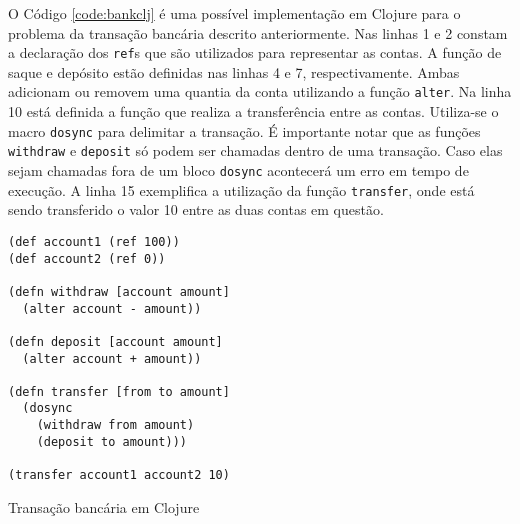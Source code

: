 O Código \ref{code:bankclj} é uma possível implementação em Clojure para o problema da transação bancária descrito anteriormente. Nas linhas 1 e 2 constam a declaração dos \verb|ref|s que são utilizados para representar as contas. A função de saque e depósito estão definidas nas linhas 4 e 7, respectivamente. Ambas adicionam ou removem uma quantia da conta utilizando a função \verb|alter|. Na linha 10 está definida a função que realiza a transferência entre as contas. Utiliza-se o macro \verb|dosync| para delimitar a transação. É importante notar que as funções \verb|withdraw| e \verb|deposit| só podem ser chamadas dentro de uma transação. Caso elas sejam chamadas fora de um bloco \verb|dosync| acontecerá um erro em tempo de execução. A linha 15 exemplifica a utilização da função \verb|transfer|, onde está sendo transferido o valor 10 entre as duas contas em questão.

\begin{listing}
  \begin{verbatim}
(def account1 (ref 100))
(def account2 (ref 0))

(defn withdraw [account amount]
  (alter account - amount))

(defn deposit [account amount]
  (alter account + amount))

(defn transfer [from to amount]
  (dosync 
    (withdraw from amount)
    (deposit to amount)))

(transfer account1 account2 10)
  \end{verbatim}
  \caption{Transação bancária em Clojure}
  \label{code:bankclj}
\end{listing}